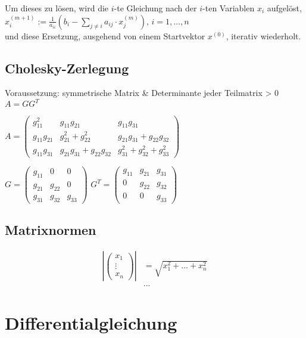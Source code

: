 \documentclass[a4paper, 10pt, landscape]{article}
\newcommand{\bspVec}{\ensuremath{\begin{pmatrix} x_1\\ \vdots \\ x_n \end{pmatrix}}}
\begin{document}
\begin{multicols}{5}
\begin{small}
			Um dieses zu lösen, wird die $i$-te Gleichung nach der $i$-ten Variablen $x_i$ aufgelöst,\\
			$x_i^{(m+1)}:=\frac1{a_{ii}}\left(b_i-\sum_{j\not=i} a_{ij}\cdot x_j^{(m)}\right), \, i=1,\dotsc,n$\\
			und diese Ersetzung, ausgehend von einem Startvektor $x^{(0)}$, iterativ wiederholt.
		\subsection{Cholesky-Zerlegung}
			Voraussetzung: symmetrische Matrix \& Determinante jeder Teilmatrix > 0\\
			$A=GG^{T}$\\
			
			\begin{tiny}
				$A=\begin{pmatrix}
					g_{11}^{2} & g_{11}g_{21} & g_{11}g_{31}\\
					g_{11}g_{21} & g_{21}^{2}+g_{22}^{2} & g_{21}g_{31}+g_{22}g_{32}\\
					g_{11}g_{31} & g_{21}g_{31}+g_{22}g_{32} & g_{31}^{2}+g_{32}^{2}+g_{33}^{2}
				\end{pmatrix}$
				\begin{multicols}{2}
					$G=\begin{pmatrix}
						g_{11} & 0 & 0\\
						g_{21} & g_{22} & 0\\
						g_{31} & g_{32} & g_{33}
					\end{pmatrix}$
					$G^{T}=\begin{pmatrix}
						g_{11} & g_{21} & g_{31}\\
						0 & g_{22} & g_{32}\\
						0 & 0 & g_{33}
					\end{pmatrix}$
				\end{multicols}
			\end{tiny}
		\subsection{Matrixnormen}
			\begin{tiny}
				\begin{align*}
					\left|\bspVec\right| &= \sqrt{x_1^2 + ... + x_n^2}\\
					&... 
				\end{align*}
			\end{tiny}
	\section{Differentialgleichung}

\end{small}
\end{multicols}
\end{document}
